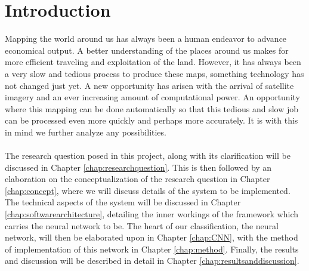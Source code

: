 \documentclass[a4paper,onecolumn]{report}
\begin{document}
{\small \tableofcontents}


\chapter{Introduction}

Mapping the world around us has always been a human endeavor to advance economical output. A better understanding of the places around us makes for more efficient traveling and exploitation of the land. However, it has always been a very slow and tedious process to produce these maps, something technology has not changed just yet. A new opportunity has arisen with the arrival of satellite imagery and an ever increasing amount of computational power. An opportunity where this mapping can be done automatically so that this tedious and slow job can be processed even more quickly and perhaps more accurately. It is with this in mind we further analyze any possibilities.\\
\\
The research question posed in this project, along with its clarification will be discussed in Chapter \ref{chap:researchquestion}. This is then followed by an elaboration on the conceptualization of the research question in Chapter \ref{chap:concept}, where we will discuss details of the system to be implemented. The technical aspects of the system will be discussed in Chapter \ref{chap:softwarearchitecture}, detailing the inner workings of the framework which carries the neural network to be. The heart of our classification, the neural network, will then be elaborated upon in Chapter \ref{chap:CNN}, with the method of implementation of this network in Chapter \ref{chap:method}. Finally, the results and discussion will be described in detail in Chapter \ref{chap:resultsanddiscussion}.
\end{document}

